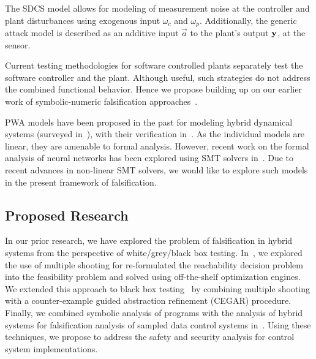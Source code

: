 The SDCS model allows for modeling of measurement noise at the
controller and plant disturbances using exogenous input $\omega_c$ and
$\omega_p$. Additionally, the generic attack model is described as an
additive input $\vec{a}$ to the plant's output $\mathbf{y}$, at the sensor.

Current testing methodologies for software controlled plants
separately test the software controller and the plant. Although
useful, such strategies do not address the combined functional
behavior. Hence we propose building up on our earlier work of
symbolic-numeric falsification approaches~\cite{zutshi2016symbolic}.

PWA models have been proposed in the past for modeling hybrid
dynamical systems (surveyed in~\cite{paoletti2007identification}),
with their verification in~\cite{yordanov2007model,
yordanov2010formal, koutsoukos2003safety, batt2007model}. As the
individual models are linear, they are amenable to formal analysis.
However, recent work on the formal analysis of neural networks has
been explored using SMT solvers in~\cite{pulina2012challenging,
pulina2011never, pulina2011checking, katz2017reluplex}. Due to recent
advances in non-linear SMT solvers, we would like to explore such
models in the present framework of falsification.


\subsection{Proposed Research}

In our prior research, we have explored the problem of falsification
in hybrid systems from the perspective of white/grey/black box
testing. In~\cite{Zutshi+Others/2013/Trajectory}, we explored the use
of multiple shooting for re-formulated the reachability decision
problem into the feasibility problem and solved using off-the-shelf
optimization engines. We extended this approach to black box
testing~\cite{zutshi2014multiple} by combining multiple shooting with
a counter-example guided abstraction refinement (CEGAR) procedure.
Finally, we combined symbolic analysis of programs with the analysis
of hybrid systems for falsification analysis of sampled data control
systems in~\cite{zutshi2016symbolic}.
Using these techniques, we propose to address the safety and security
analysis for control system implementations.

